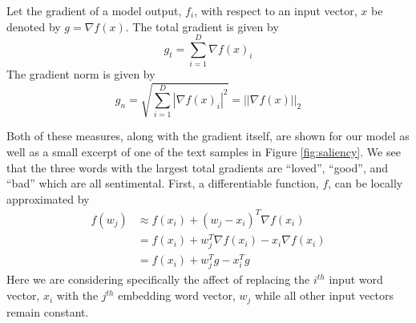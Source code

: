 \noindent
\begin{definition}
Let the gradient of a model output, $f_i$, with respect to an input vector, $x$ be denoted by $g=\nabla f(x)$.  The total gradient is given by 
\begin{equation}
g_t = \sum_{i=1}^D \nabla f(x)_i
\end{equation}
The gradient norm is given by 
\begin{equation}
g_n = \sqrt{\sum_{i=1}^D |\nabla f(x)_i|^2} = ||\nabla f(x)||_2
\end{equation}
\end{definition}

Both of these measures, along with the gradient itself, are shown for our model as well as a small excerpt of one of the text samples in Figure \ref{fig:saliency}.  We see that the three words with the largest total gradients are ``loved'', ``good'', and ``bad'' which are all sentimental.  First, a differentiable function, $f$, can be locally approximated by
\begin{align}
f(w_j) &\approx f(x_i) + (w_j-x_i)^T\nabla f(x_i) \\
     &= f(x_i) + w_j^T\nabla f(x_i) - x_i\nabla f(x_i) \\
     &= f(x_i) + w_j^Tg - x_i^Tg \label{approx}
\end{align}
Here we are considering specifically the affect of replacing the $i^{th}$ input word vector, $x_i$ with the $j^{th}$ embedding word vector, $w_j$ while all other input vectors remain constant.

